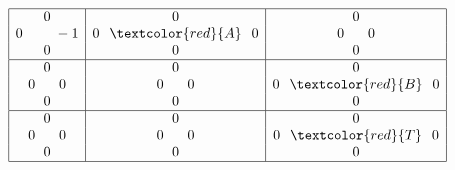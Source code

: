 \documentclass{beamer}
\begin{document}
\begin{frame}
\begin{figure}[!ht]
\centering
$$\begin{array}{|c|c|c|}
\hline
0                      & 0                           & 0 \\
0\hspace*{0.8cm} -1 & 0\hspace*{0.25cm}\textcolor{red}{A}\hspace*{0.25cm}  0                  & 0\hspace*{0.6cm}0 \\
0          & 0          & 0 \\
\hline
0          & 0                            & 0 \\
0\hspace*{0.6cm}0   & 0\hspace*{0.6cm} 0                  & 0\hspace*{0.25cm}\textcolor{red}{B}\hspace*{0.25cm} 0 \\
0           & 0          & 0 \\
\hline
0          & 0                         & 0\\
0\hspace*{0.6cm} 0                     & 0\hspace*{0.6cm}0                & 0\hspace*{0.25cm}\textcolor{red}{T}\hspace*{0.25cm} 0 \\
0                            & 0        & 0 \\
\hline
\end{array}
$$
\end{figure}
\end{frame}
\end{document}
